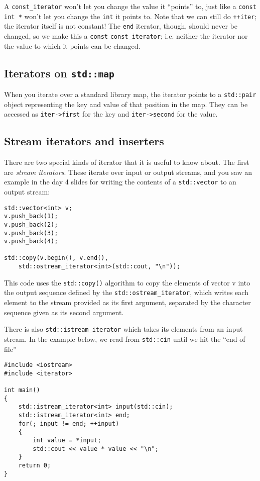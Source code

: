 \documentclass[a4paper]{scrartcl}
\begin{document}
A \verb|const_iterator| won't let you change the value it ``points'' to, just like a \verb|const int *| won't let you change the \verb|int| it points to. Note that we can still do \verb|++iter|; the iterator itself is not constant! The \verb|end| iterator, though, should never be changed, so we make this a \verb|const| \verb|const_iterator|; i.e. neither the iterator nor the value to which it points can be changed.

\subsection{Iterators on \texttt{std::map}}
When you iterate over a standard library map, the iterator points to a \verb|std::pair| object representing the key and value of that position in the map. They can be accessed as \verb|iter->first| for the key and \verb|iter->second| for the value.

\subsection{Stream iterators and inserters}
There are two special kinds of iterator that it is useful to know about. The first are \emph{stream iterators}. These iterate over input or output streams, and you saw an example in the day 4 slides for writing the contents of a \verb|std::vector| to an output stream:
\begin{verbatim}
std::vector<int> v;
v.push_back(1);
v.push_back(2);
v.push_back(3);
v.push_back(4);

std::copy(v.begin(), v.end(),
    std::ostream_iterator<int>(std::cout, "\n"));
\end{verbatim}

This code uses the \verb|std::copy()| algorithm to copy the elements of vector v into the output sequence defined by the \verb|std::ostream_iterator|, which writes each element to the stream provided as its first argument, separated by the character sequence given as its second argument.

There is also \verb|std::istream_iterator| which takes its elements from an input stream. In the example below, we read from \verb|std::cin| until we hit the ``end of file''
\begin{verbatim}
#include <iostream>
#include <iterator>

int main()
{
    std::istream_iterator<int> input(std::cin);
    std::istream_iterator<int> end;
    for(; input != end; ++input)
    {
        int value = *input;
        std::cout << value * value << "\n";
    }
    return 0;
}
\end{verbatim}
\end{document}
